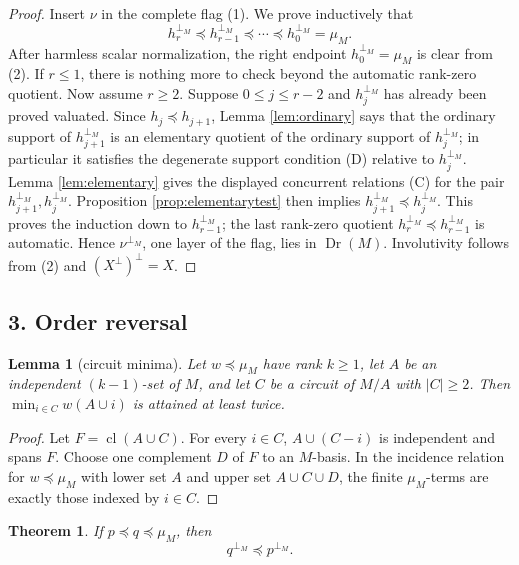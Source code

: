 \documentclass[12pt]{article}
\newcommand{\Dr}{\operatorname{Dr}}
\newcommand{\cl}{\operatorname{cl}}
\newtheorem{theorem}{Theorem}
\newtheorem{lemma}{Lemma}
\begin{document}
\begin{proof}
Insert $\nu$ in the complete flag (1).  We prove inductively that
\[
        h_r^{\perp_M}\preceq h_{r-1}^{\perp_M}\preceq\cdots
        \preceq h_0^{\perp_M}=\mu_M .
\]
After harmless scalar normalization, the right endpoint
$h_0^{\perp_M}=\mu_M$ is clear from (2).  If $r\le1$, there is
nothing more to check beyond the automatic rank-zero quotient.  Now assume $r\ge2$.
Suppose $0\le j\le r-2$ and $h_j^{\perp_M}$ has
already been proved valuated.  Since $h_j\preceq h_{j+1}$, Lemma
\ref{lem:ordinary} says that the ordinary support of
$h_{j+1}^{\perp_M}$ is an elementary quotient of the ordinary support of
$h_j^{\perp_M}$; in particular it satisfies the degenerate support
condition (D) relative to $h_j^{\perp_M}$.  Lemma
\ref{lem:elementary} gives the displayed concurrent relations (C) for
the pair $h_{j+1}^{\perp_M},h_j^{\perp_M}$.  Proposition
\ref{prop:elementarytest} then implies
$h_{j+1}^{\perp_M}\preceq h_j^{\perp_M}$.  This proves the induction
down to $h_{r-1}^{\perp_M}$; the last rank-zero quotient
$h_r^{\perp_M}\preceq h_{r-1}^{\perp_M}$ is automatic.  Hence $\nu^{\perp_M}$, one layer of the flag, lies in
$\Dr(M)$.  Involutivity follows from (2) and $(X^\perp)^\perp=X$.
\end{proof}

\subsection*{3. Order reversal}

\begin{lemma}[circuit minima]\label{lem:circuit}
Let $w\preceq\mu_M$ have rank $k\ge1$, let $A$ be an independent
$(k-1)$-set of $M$, and let $C$ be a circuit of $M/A$ with $|C|\ge2$.
Then $\min_{i\in C}w(A\cup i)$ is attained at least twice.
\end{lemma}

\begin{proof}
Let $F=\cl(A\cup C)$.  For every $i\in C$, $A\cup(C-i)$ is independent
and spans $F$.  Choose one complement $D$ of $F$ to an $M$-basis.  In
the incidence relation for $w\preceq\mu_M$ with lower set $A$ and upper
set $A\cup C\cup D$, the finite $\mu_M$-terms are exactly those indexed
by $i\in C$.
\end{proof}

\begin{theorem}\label{thm:order}
If $p\preceq q\preceq\mu_M$, then
\[
        q^{\perp_M}\preceq p^{\perp_M}.
\]
\end{theorem}
\end{document}
